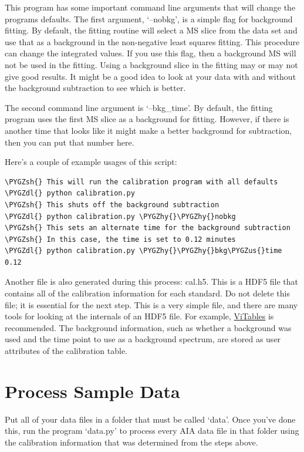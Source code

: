\documentclass[letterpaper,10pt,english]{sphinxmanual}
\def\PYGZus{\char`\_}
\def\PYGZsh{\char`\#}
\def\PYGZdl{\char`\$}
\def\PYGZhy{\char`\-}
\begin{document}
This program has some important command line arguments that will change the
programs defaults. The first argument, `--nobkg', is a simple flag for
background fitting. By default, the fitting routine will select a MS slice
from the data set and use that as a background in the non-negative least
squares fitting. This procedure can change the integrated values. If you use
this flag, then a background MS will not be used in the fitting. Using a
background slice in the fitting may or may not give good results. It might be
a good idea to look at your data with and without the background subtraction
to see which is better.

The second command line argument is `--bkg\_time'. By default, the fitting
program uses the first MS slice as a background for fitting.  However, if
there is another time that looks like it might make a better background for
subtraction, then you can put that number here.

Here's a couple of example usages of this script:

\begin{Verbatim}[commandchars=\\\{\}]
\PYGZsh{} This will run the calibration program with all defaults
\PYGZdl{} python calibration.py
\PYGZsh{} This shuts off the background subtraction
\PYGZdl{} python calibration.py \PYGZhy{}\PYGZhy{}nobkg
\PYGZsh{} This sets an alternate time for the background subtraction
\PYGZsh{} In this case, the time is set to 0.12 minutes
\PYGZdl{} python calibration.py \PYGZhy{}\PYGZhy{}bkg\PYGZus{}time 0.12
\end{Verbatim}

Another file is also generated during this process: cal.h5. This is a HDF5
file that contains all of the calibration information for each standard. Do
not delete this file; it is essential for the next step. This is a very simple
file, and there are many tools for looking at the internals of an HDF5 file.
For example, \href{http://vitables.org/}{ViTables} is recommended. The background
information, such as whether a background was used and the time point to use
as a background spectrum, are stored as user attributes of the calibration
table.


\chapter{Process Sample Data}
\label{autoint:vitables}\label{autoint:process-sample-data}\label{autoint::doc}
Put all of your data files in a folder that must be called `data'. Once you've
done this, run the program `data.py' to process every AIA data file in that
folder using the calibration information that was determined from the steps
above.
\end{document}
